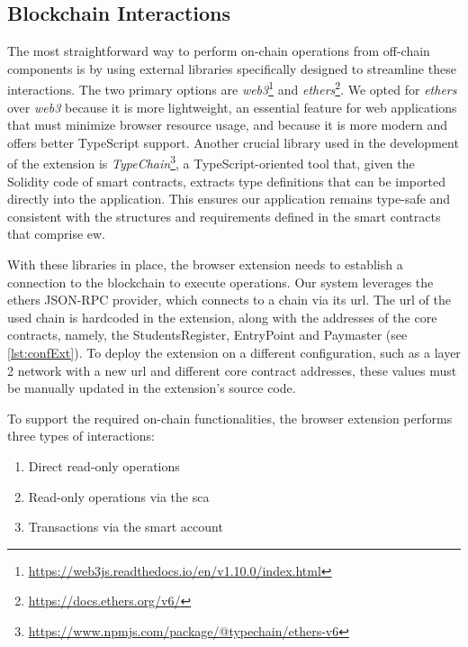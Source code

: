 \subsection{Blockchain Interactions}
\label{ssec:extBlockchainInteraction}
The most straightforward way to perform on-chain operations from off-chain components is by using external libraries specifically designed to streamline these interactions. The two primary options are \textit{web3}\footnote{\url{https://web3js.readthedocs.io/en/v1.10.0/index.html}} and \textit{ethers}\footnote{\url{https://docs.ethers.org/v6/}}. We opted for \textit{ethers} over \textit{web3} because it is more lightweight, an essential feature for web applications that must minimize browser resource usage, and because it is more modern and offers better TypeScript support. 
Another crucial library used in the development of the extension is \textit{TypeChain}\footnote{\url{https://www.npmjs.com/package/@typechain/ethers-v6}}, a TypeScript-oriented tool that, given the Solidity code of smart contracts, extracts type definitions that can be imported directly into the application. This ensures our application remains type-safe and consistent with the structures and requirements defined in the smart contracts that comprise \gls{ew}. 

With these libraries in place, the browser extension needs to establish a connection to the blockchain to execute operations. Our system leverages the ethers JSON-RPC provider, which connects to a chain via its \gls{url}. The \gls{url} of the used chain is hardcoded in the extension, along with the addresses of the core contracts, namely, the StudentsRegister, EntryPoint and Paymaster (see \cref{lst:confExt}). To deploy the extension on a different configuration, such as a layer 2 network with a new \gls{url} and different core contract addresses, these values must be manually updated in the extension's source code.



To support the required on-chain functionalities, the browser extension performs three types of interactions:
\begin{enumerate}
    \item Direct read-only operations
    \item Read-only operations via the \gls{sca}
    \item Transactions via the smart account
\end{enumerate}

